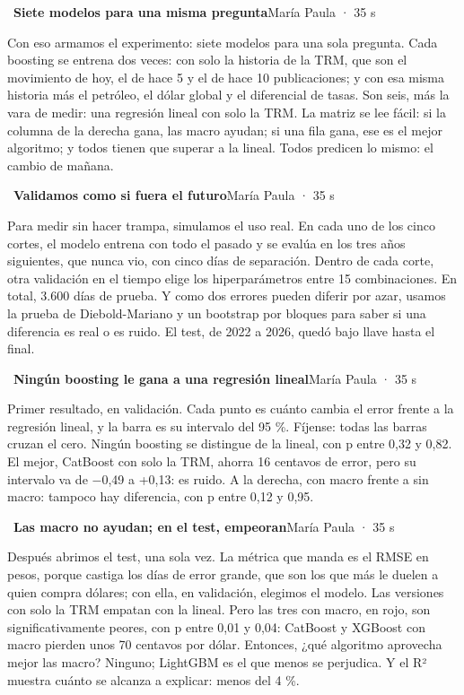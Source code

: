 \documentclass[11pt,letterpaper]{article}
\newcommand{\diapo}[4]{\par\bigskip{\color{oro}\textbf{#1.}}~\textbf{#2}\hfill{\small #3 · #4}\par\nopagebreak\smallskip}
\begin{document}
\diapo{7}{Siete modelos para una misma pregunta}{María Paula}{35 s}
Con eso armamos el experimento: siete modelos para una sola pregunta. Cada boosting se entrena dos veces: con solo la historia de la TRM, que son el movimiento de hoy, el de hace 5 y el de hace 10 publicaciones; y con esa misma historia más el petróleo, el dólar global y el diferencial de tasas. Son seis, más la vara de medir: una regresión lineal con solo la TRM. La matriz se lee fácil: si la columna de la derecha gana, las macro ayudan; si una fila gana, ese es el mejor algoritmo; y todos tienen que superar a la lineal. Todos predicen lo mismo: el cambio de mañana.

\diapo{8}{Validamos como si fuera el futuro}{María Paula}{35 s}
Para medir sin hacer trampa, simulamos el uso real. En cada uno de los cinco cortes, el modelo entrena con todo el pasado y se evalúa en los tres años siguientes, que nunca vio, con cinco días de separación. Dentro de cada corte, otra validación en el tiempo elige los hiperparámetros entre 15 combinaciones. En total, 3.600 días de prueba. Y como dos errores pueden diferir por azar, usamos la prueba de Diebold-Mariano y un bootstrap por bloques para saber si una diferencia es real o es ruido. El test, de 2022 a 2026, quedó bajo llave hasta el final.

\diapo{9}{Ningún boosting le gana a una regresión lineal}{María Paula}{35 s}
Primer resultado, en validación. Cada punto es cuánto cambia el error frente a la regresión lineal, y la barra es su intervalo del 95 \%. Fíjense: todas las barras cruzan el cero. Ningún boosting se distingue de la lineal, con p entre 0,32 y 0,82. El mejor, CatBoost con solo la TRM, ahorra 16 centavos de error, pero su intervalo va de $-$0,49 a +0,13: es ruido. A la derecha, con macro frente a sin macro: tampoco hay diferencia, con p entre 0,12 y 0,95.

\diapo{10}{Las macro no ayudan; en el test, empeoran}{María Paula}{35 s}
Después abrimos el test, una sola vez. La métrica que manda es el RMSE en pesos, porque castiga los días de error grande, que son los que más le duelen a quien compra dólares; con ella, en validación, elegimos el modelo. Las versiones con solo la TRM empatan con la lineal. Pero las tres con macro, en rojo, son significativamente peores, con p entre 0,01 y 0,04: CatBoost y XGBoost con macro pierden unos 70 centavos por dólar. Entonces, ¿qué algoritmo aprovecha mejor las macro? Ninguno; LightGBM es el que menos se perjudica. Y el R² muestra cuánto se alcanza a explicar: menos del 4 \%.
\par{}
\end{document}
